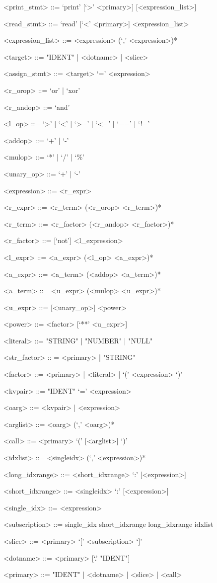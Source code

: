 \documentclass[10pt,a4paper]{article}
\begin{document}
\begin{grammar}
<print_stmt> ::= `print' [`>' <primary>] [<expression_list>]

<read_stmt> ::= `read' [`<' <primary>] <expression_list>

<expression_list> ::= <expression> (`,' <expression>)*

<target> ::= "IDENT" | <dotname> | <slice>

<assign_stmt> ::= <target> `=' <expression>

<r_orop> ::= `or' | `xor'

<r_andop> ::= `and'

<l_op> ::= `>' | `<' | `>=' | `<=' | `==' | `!='

<addop> ::= `+' | `-'

<mulop> ::= `*' | `/' | `\%'

<unary_op> ::= `+' | `-'

<expression> ::= <r_expr>

<r_expr> ::= <r_term> (<r_orop> <r_term>)*

<r_term> ::= <r_factor> (<r_andop> <r_factor>)*

<r_factor> ::= [`not'] <l_expression>

<l_expr> ::= <a_expr> (<l_op> <a_expr>)*

<a_expr> ::= <a_term> (<addop> <a_term>)*

<a_term> ::= <u_expr> (<mulop> <u_expr>)*

<u_expr> ::= [<unary_op>] <power>

<power> ::= <factor> [`**' <u_expr>]

<literal> ::= "STRING" | "NUMBER" | "NULL"

<str_factor> :: = <primary> | "STRING"

<factor> ::= <primary> | <literal> | `(' <expression> `)'

<kvpair> ::= "IDENT" `=' <expression>

<oarg> ::= <kvpair> | <expression>

<arglist> ::= <oarg> (`,' <oarg>)*

<call> ::= <primary> `(' [<arglist>] `)'

<idxlist> ::= <singleidx> (`,' <expression>)*

<long_idxrange> ::= <short_idxrange> `:' [<expression>]

<short_idxrange> ::= <singleidx> `:' [<expression>] 

<single_idx> ::= <expression>

<subscription> ::= single_idx 
	\alt short_idxrange 
	\alt long_idxrange 
	\alt idxlist

<slice> ::= <primary> `[' <subscription> `]'

<dotname> ::= <primary> [`.' "IDENT"]

<primary> ::= "IDENT" | <dotname> | <slice> | <call>

\end{grammar}
\end{document}
